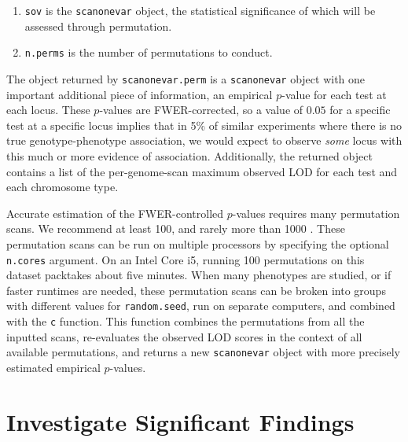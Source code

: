 \documentclass{article}
\begin{document}
\begin{enumerate}
	\item \texttt{sov} is the \texttt{scanonevar} object, the statistical significance of which will be assessed through permutation.
	\item \texttt{n.perms} is the number of permutations to conduct.
\end{enumerate}

The object returned by \texttt{scanonevar.perm} is a \texttt{scanonevar} object with one important additional piece of information, an empirical $p$-value for each test at each locus.
These $p$-values are FWER-corrected, so a value of $0.05$ for a specific test at a specific locus implies that in 5\% of similar experiments where there is no true genotype-phenotype association, we would expect to observe \textit{some} locus with this much or more evidence of association.
Additionally, the returned object contains a list of the per-genome-scan maximum observed LOD for each test and each chromosome type.



Accurate estimation of the FWER-controlled $p$-values requires many permutation scans.
We recommend at least 100, and rarely more than 1000 \citep{Churchill1994,Carlborg2002}.
These permutation scans can be run on multiple processors by specifying the optional \texttt{n.cores} argument.
On an Intel Core i5, running 100 permutations on this dataset packtakes about five minutes.
When many phenotypes are studied, or if faster runtimes are needed, these permutation scans can be broken into groups with different values for \texttt{random.seed}, run on separate computers, and combined with the \texttt{c} function.
This function combines the permutations from all the inputted scans, re-evaluates the observed LOD scores in the context of all available permutations, and returns a new \texttt{scanonevar} object with more precisely estimated empirical $p$-values.






\section*{Investigate Significant Findings}
\end{document}
